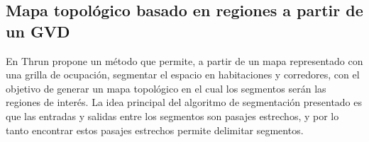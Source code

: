 



\subsection{Mapa topológico basado en regiones a partir de un GVD}\label{subsec:mapaTopGVD}
En \cite{Thrun1998} Thrun propone un método que permite, a partir de un mapa representado con una grilla de ocupación, segmentar el espacio en habitaciones y corredores, con el objetivo de generar un mapa topológico en el cual los segmentos serán las regiones de interés. La idea principal del algoritmo de segmentación presentado es que las entradas y salidas entre los segmentos son pasajes estrechos, y por lo tanto encontrar estos pasajes estrechos permite delimitar segmentos.

